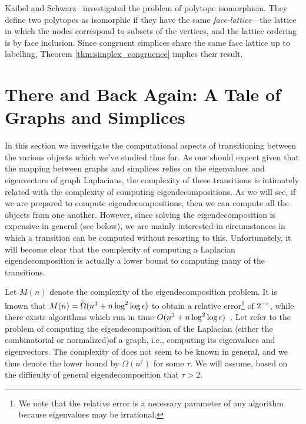 Kaibel and Schwarz~\cite{kaibel2008complexity} investigated the problem of polytope isomorphism. They define two polytopes as isomorphic if they have the same \emph{face-lattice}---the lattice in which the nodes correspond to subsets of the vertices, and the lattice ordering is by face inclusion. Since congruent simplices share the same face  lattice up to labelling, Theorem \ref{thm:simplex_congruence} implies their result. 


\section{There and Back Again: A Tale of Graphs and Simplices}
\label{sec:algorithmics_transitions}
In this section we investigate the computational aspects of transitioning between the various objects which we've studied thus far. As one should expect given that the mapping between graphs and simplices relies on the  eigenvalues and eigenvectors of graph  Laplacians, the complexity of these transitions is intimately related with the complexity of computing  eigendecompositions. 
As we will see, if we are prepared to compute  eigendecompositions, then we can compute all the objects from one another. 
However, since solving the eigendecomposition is expensive in general (see below), we are mainly interested in circumstances in which a transition can be computed without resorting to this. Unfortunately, it will become clear that the complexity of  computing a Laplacian eigendecomposition is actually a lower bound to computing many of the transitions. 
 
Let $M(n)$ denote the complexity of the eigendecomposition problem. It is known that  $M(n)=\widetilde{\Omega}(n^3 + n\log^2 \log \epsilon)$ to obtain a relative error\footnote{We note that the relative error is a necessary parameter of any algorithm because eigenvalues may be irrational.} of $2^{-\epsilon}$, while there exists algorithms which run in time $O(n^3 + n\log^2 \log \epsilon)$~\cite{pan1999complexity}.  
Let \lapdecomp refer to the problem of computing the eigendecomposition of the Laplacian (either the combinatorial or normalized)of a graph, i.e., computing its eigenvalues and eigenvectors. The complexity of \lapdecomp does not seem to be known  in general, and we thus denote the lower bound by $\Omega(n^\tau)$ for some $\tau$. We will assume, based on the difficulty of general eigendecomposition that $\tau>2$. 


